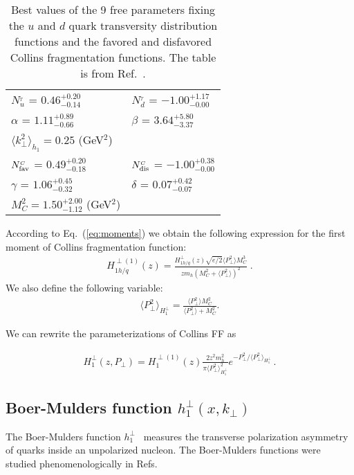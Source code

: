 \documentclass[a4paper,11pt]{article}
\newcommand{\ba}{\begin{eqnarray}}
\newcommand{\ea}{\end{eqnarray}}
\newcommand{\la}{\langle}
\newcommand{\ra}{\rangle}
\def\T{_{_T}}
\def\C{_{_C}}
\def\kperp{k_\perp}
\def\pperp{P_\perp}
\def\avkperp{\la \kperp^2 \ra}
\def\avpperp{\la \pperp^2 \ra}
\begin{document}
\begin{table}[h]
\centering
\renewcommand{\tabcolsep}{0.4pc} %
\renewcommand{\arraystretch}{1.2} %
\begin{tabular}{@{ }ll}
 \hline
 $N_{u}^{\T}$ = $0.46^{+0.20}_{-0.14}$ & $N_{d}^{\T}$ = $ -1.00^{+1.17}_{-0.00}$ \\
 $\alpha$ =  $1.11^{+0.89}_{-0.66}$ & $\beta$  = $3.64^{+5.80}_{-3.37}$ \\
 $\avkperp_{h_1} = 0.25$ (GeV$^2$) & \\
 \hline
 $N_{\rm fav}^{\C}$  = $0.49^{+0.20}_{-0.18}$ & $N_{\rm dis}^{\C}$  = 
 $-1.00^{+0.38}_{-0.00}$ \\
 $\gamma$  = $1.06^{+0.45}_{-0.32}$  & $\delta$   = $0.07^{+0.42}_{-0.07}$    \\
 $M^2_C = 1.50^{+2.00}_{-1.12}$ (GeV$^2$) & \\
 \hline
\end{tabular}
\caption{
Best values of the 9 free parameters fixing the $u$ and $d$ quark
transversity distribution functions and the favored and
disfavored Collins fragmentation functions. The table is from Ref.~\cite{Anselmino:2013vqa}.
\label{fitpar}}
\end{table}


According to Eq.~(\ref{eq:moments}) we obtain the following expression for the first moment of 
Collins fragmentation function: 
\ba
H_{1 h/q}^{\perp (1)}(z) = \frac{H_{1 h/q}^{\perp}(z) \sqrt{e/2}  \avpperp M_C^3}{z m_h  (M_C^2+\avpperp)^2}\; .
\ea 
We also define the following variable:
\ba
\avpperp_{H_1^\perp} = \frac{\avpperp M_C^2 }{\avpperp + M_C^2} .  
\ea

We can rewrite the parameterizations of Collins FF as

\ba
H_{1}^{\perp}(z,\pperp) =  H_{1}^{\perp (1)}(z)   \frac{2 z^2 m_h^2}{\pi \avpperp_{H_{1}^\perp}^2} e^{-\pperp^2/{\avpperp_{H_{1}^\perp}}}
\label{coll-funct_new} \, .
\ea

\subsection{\boldmath Boer-Mulders function $h_{1}^{\perp}(x,k_\perp)$} 
\label{App:basis-h1perp}

The Boer-Mulders function $h_{1}^{\perp}$~\cite{Boer:1997nt} measures 
the transverse polarization asymmetry of quarks inside an unpolarized 
nucleon. The Boer-Mulders functions were studied phenomenologically in 
Refs.~\cite{Barone:2009hw,Barone:2010gk,Barone:2015ksa}
\end{document}
